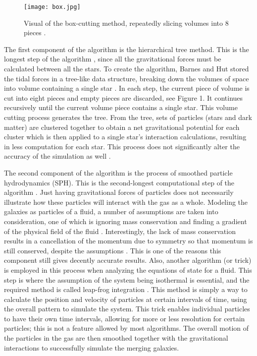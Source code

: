 \documentclass[11pt]{article} %
\begin{document}
	\begin{figure}
	  \begin{center}
	    \texttt{[image: box.jpg]}
	    \caption{Visual of the box-cutting method, repeatedly slicing volumes into 8 pieces \cite{algorithm}.}
	  \end{center}
	\end{figure}

	The first component of the algorithm is the hierarchical tree method. This is the longest step of the algorithm \cite{treesph}, since all the gravitational forces must be calculated between all the stars. To create the algorithm, Barnes and Hut stored the tidal forces in a tree-like data structure, breaking down the volumes of space into volume containing a single star \cite{algorithm}. In each step, the current piece of volume is cut into eight pieces and empty pieces are discarded, see Figure 1. It continues recursively until the current volume piece contains a single star. This volume cutting process generates the tree. From the tree, sets of particles (stars and dark matter) are clustered together to obtain a net gravitational potential for each cluster which is then applied to a single star's interaction calculations, resulting in less computation for each star. This process does not significantly alter the accuracy of the simulation as well \cite{algorithm}.

	The second component of the algorithm is the process of smoothed particle hydrodynamics (SPH). This is the second-longest computational step of the algorithm \cite{treesph}. Just having gravitational forces of particles does not necessarily illustrate how these particles will interact with the gas as a whole. Modeling the galaxies as particles of a fluid, a number of assumptions are taken into consideration, one of which is ignoring mass conservation and finding a gradient of the physical field of the fluid \cite{treesph}. Interestingly, the lack of mass conservation results in a cancellation of the momentum due to symmetry so that momentum is still conserved, despite the assumptions \cite{treesph}. This is one of the reasons this component still gives decently accurate results. Also, another algorithm (or trick) is employed in this process when analyzing the equations of state for a fluid. This step is where the assumption of the system being isothermal is essential, and the required method is called leap-frog integration \cite{treesph}. This method is simply a way to calculate the position and velocity of particles at certain intervals of time, using the overall pattern to simulate the system. This trick enables individual particles to have their own time intervals, allowing for more or less resolution for certain particles; this is not a feature allowed by most algorithms. The overall motion of the particles in the gas are then smoothed together with the gravitational interactions to successfully simulate the merging galaxies.
\end{document}
